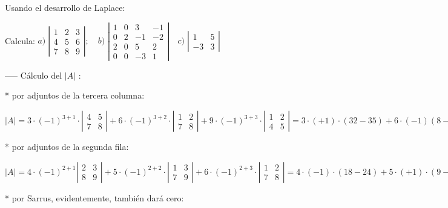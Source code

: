 \begin{ejem} Usando el desarrollo de Laplace:

Calcula: $a)\;  \left| \begin{matrix} 1&2&3\\4&5&6\\7&8&9 \end{matrix} \right|; \quad b)\; 
\left| \begin{matrix} 1&0&3&-1\\0&2&-1&-2\\2&0&5&2 \\ 0&0&-3&1  \end{matrix} \right|\quad c)\; \left| \begin{matrix} 1&5\\-3&3 \end{matrix} \right|$ 

----- Cálculo del $|A|$ :

* por adjuntos de la tercera columna:

$|A|= 
3\cdot (-1)^{3+1}\cdot \left| \begin{matrix} 4&5 \\ 7&8 \end{matrix} \right|	+
6\cdot (-1)^{3+2}\cdot \left| \begin{matrix} 1&2 \\ 7&8 \end{matrix} \right|+
9\cdot (-1)^{3+3}\cdot \left| \begin{matrix} 1&2 \\ 4&5 \end{matrix} \right|
=
3\cdot (+1) \cdot (32-35) + 6\cdot (-1) (8-14) + 9 \cdot (+1) \cdot (5-8)=
-9 +36 -27=0$

* por adjuntos de la segunda fila:

$|A|=4\cdot (-1)^{2+1}\left| \begin{matrix} 2&3\\8&9  \end{matrix} \right| +
5\cdot (-1)^{2+2}\cdot \left| \begin{matrix} 1&3\\7&9  \end{matrix} \right|+
6\cdot (-1)^{2+3}\cdot \left| \begin{matrix} 1&2\\7&8  \end{matrix} \right|=
 4\cdot (-1) \cdot (18-24) + 5\cdot (+1)\cdot (9-21) + 6 \cdot (-1) (8-14)=
 24-60+36 =0 $
 
 * por Sarrus, evidentemente, también dará cero:
 

\end{ejem}
